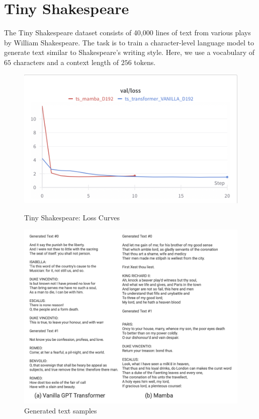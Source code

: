 \documentclass[12pt,a4paper]{report}
\begin{document}
\section{Tiny Shakespeare}

The Tiny Shakespeare dataset \cite{tinyshakespeare} consists of 40,000 lines of text from various plays by William Shakespeare. The task is to train a character-level language model to generate text similar to Shakespeare's writing style. Here, we use a vocabulary of $65$ characters and a context length of $256$ tokens.

\begin{figure}[ht]
    \centering
    \begin{minipage}[b]{0.45\textwidth}
        \centering
        \includegraphics[scale=0.4]{experiments/ts/ts_loss.png}
        \caption{Tiny Shakespeare: Loss Curves}
        \label{ts-loss}
    \end{minipage}
    \hspace{0.05\textwidth}
    \begin{minipage}[b]{0.45\textwidth}
        \centering
        \includegraphics[scale=0.4]{experiments/ts/ts_gen.png}
        \caption{Generated text samples}
        \label{ts-gen}
    \end{minipage}
\end{figure}
\end{document}
